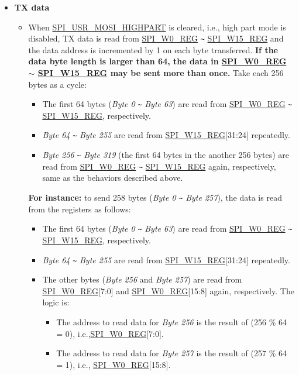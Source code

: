 \documentclass[main\_\_EN.tex]{subfiles}
\begin{document}
\begin{itemize}
    \item \textbf{TX data}
    \begin{itemize}
        \item When \hyperref[fielddesc:SPIUSRMOSIHIGHPART]{SPI\_USR\_MOSI\_HIGHPART} is cleared, i.e., high part mode is disabled, TX data is read from \hyperref[regdesc:SPIW0REG]{SPI\_W0\_REG} \verb+~+ \hyperref[regdesc:SPIW0REG]{SPI\_W15\_REG} and the data address is incremented by 1 on each byte transferred. \textbf{If the data byte length is larger than 64, the data in \hyperref[regdesc:SPIW0REG]{SPI\_W0\_REG} $\sim$ \hyperref[regdesc:SPIW0REG]{SPI\_W15\_REG} may be sent more than once.} Take each 256 bytes as a cycle:
        \begin{itemize}
            \item The first 64 bytes (\emph{Byte 0} \verb+~+ \emph{Byte 63}) are read from \hyperref[regdesc:SPIW0REG]{SPI\_W0\_REG} \verb+~+ \hyperref[regdesc:SPIW0REG]{SPI\_W15\_REG}, respectively.
            \item \emph{Byte 64} \verb+~+ \emph{Byte 255} are read from  \hyperref[regdesc:SPIW0REG]{SPI\_W15\_REG}[31:24] repeatedly. 
            \item \emph{Byte 256} \verb+~+ \emph{Byte 319} (the first 64 bytes in the another 256 bytes) are read from \hyperref[regdesc:SPIW0REG]{SPI\_W0\_REG} \verb+~+ \hyperref[regdesc:SPIW0REG]{SPI\_W15\_REG} again, respectively, same as the behaviors described above.
        \end{itemize}
        \textbf{For instance:} to send 258 bytes (\emph{Byte 0} \verb+~+ \emph{Byte 257}), the data is read from the registers as follows:
        \begin{itemize}
            \item The first 64 bytes (\emph{Byte 0} \verb+~+ \emph{Byte 63}) are read from \hyperref[regdesc:SPIW0REG]{SPI\_W0\_REG} \verb+~+ \hyperref[regdesc:SPIW0REG]{SPI\_W15\_REG}, respectively.
            \item \emph{Byte 64} \verb+~+ \emph{Byte 255} are read from \hyperref[regdesc:SPIW0REG]{SPI\_W15\_REG}[31:24] repeatedly.
            \item The other bytes (\emph{Byte 256} and \emph{Byte 257}) are read from \hyperref[regdesc:SPIW0REG]{SPI\_W0\_REG}[7:0] and \hyperref[regdesc:SPIW0REG]{SPI\_W0\_REG}[15:8] again, respectively. The logic is:
            \begin{itemize}
                \item The address to read data for \emph{Byte 256} is the result of (256 \% 64 = 0), i.e.,\hyperref[regdesc:SPIW0REG]{SPI\_W0\_REG}[7:0].
                \item The address to read data for \emph{Byte 257} is the result of (257 \% 64 = 1), i.e., \hyperref[regdesc:SPIW0REG]{SPI\_W0\_REG}[15:8].
            \end{itemize}
        \end{itemize}
        

\end{itemize}
\end{itemize}
\end{document}
